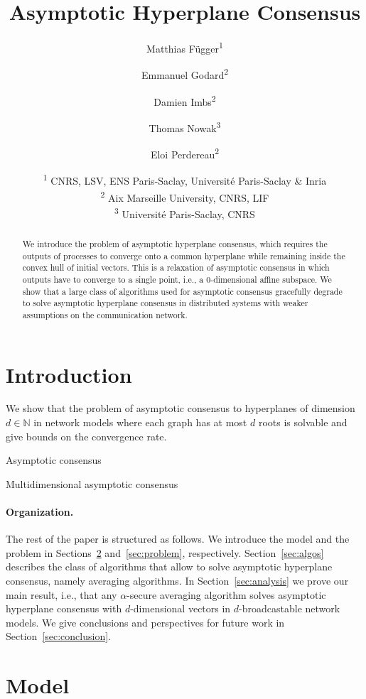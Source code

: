 \documentclass{article}
\title{Asymptotic Hyperplane Consensus}
\author{Matthias F\"ugger\textsuperscript{1} \and Emmanuel Godard\textsuperscript{2} \and Damien Imbs\textsuperscript{2} \and Thomas Nowak\textsuperscript{3} \and Eloi Perdereau\textsuperscript{2}}
\date{\textsuperscript{1} CNRS, LSV, ENS Paris-Saclay, Universit\'e Paris-Saclay \& Inria\\\textsuperscript{2} Aix Marseille University, CNRS, LIF\\\textsuperscript{3} Universit\'e Paris-Saclay, CNRS}
\newcommand{\IN}{\mathbb{N}}
\begin{document}
\maketitle

\begin{abstract}
We introduce the problem of asymptotic hyperplane consensus, which requires the outputs of processes to converge onto a common hyperplane while remaining inside the convex hull of initial vectors.
This is a relaxation of asymptotic consensus in which outputs have to converge to a single point, i.e., a $0$-dimensional affine subspace.
We show that a large class of algorithms used for asymptotic consensus gracefully degrade to solve asymptotic hyperplane consensus in distributed systems with weaker assumptions on the communication network.
\end{abstract}


\section{Introduction}

We show that the problem of asymptotic consensus to hyperplanes of dimension $d \in \IN$ in network models where
each graph has at most $d$ roots is solvable and give bounds on the convergence rate.

Asymptotic consensus \cite{CBFN15:icalp}

Multidimensional asymptotic consensus \cite{FN18:disc}


\paragraph{Organization.} The rest of the paper is structured as follows.
We introduce the model and the problem in Sections~\ref{sec:model} and~\ref{sec:problem}, respectively.
Section~\ref{sec:algos} describes the class of algorithms that allow to solve asymptotic hyperplane consensus, namely averaging algorithms.
In Section~\ref{sec:analysis} we prove our main result, i.e., that any $\alpha$-secure averaging algorithm solves asymptotic hyperplane consensus with $d$-dimensional vectors in $d$-broadcastable network models.
We give conclusions and perspectives for future work in Section~\ref{sec:conclusion}.

\section{Model}\label{sec:model}
\end{document}
